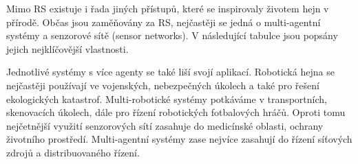 \par 
Mimo RS existuje i řada jiných přístupů, které se inspirovaly životem hejn v přírodě. Občas jsou zaměňovány za RS, nejčastěji se jedná o multi-agentní systémy a senzorové sítě (sensor networks). V následující tabulce jsou popsány jejich nejklíčovější vlastnosti. \par
\begin{center}
    \begin{table}[h] 
	\caption{Porovnání systémů s více agenty}
    \end{table}
    \end{center}
    Jednotlivé systémy s více agenty se také liší svojí aplikací. Robotická hejna se nejčastěji používají ve vojenských, nebezpečných úkolech a také pro řešení ekologických katastrof. Multi-robotické systémy potkáváme v transportních, skenovacích úkolech, dále pro řízení robotických fotbalových hráčů. Oproti tomu nejčetnější využití senzorových sítí zasahuje do medicínské oblasti, ochrany životního prostředí. Multi-agentní systémy zase nejvíce zasahují do řízení síťových zdrojů a distribuovaného řízení. 
